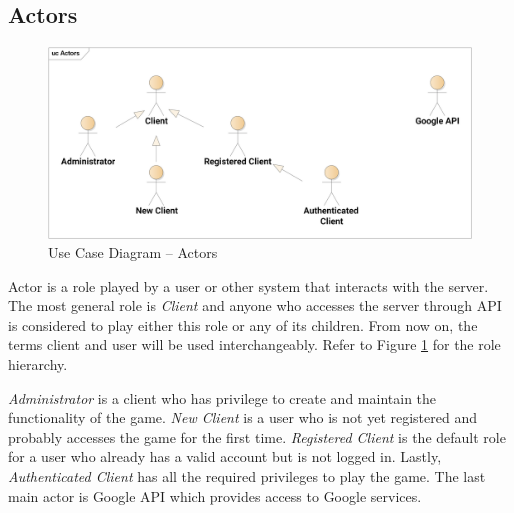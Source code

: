 	\subsection{Actors}
		\begin{figure}[h]	
			\includegraphics[width=\textwidth]{figures/UC_Actors}
			\centering			
			\caption{Use Case
				 Diagram -- Actors}
			\label{fig:ucactors}
		\end{figure}
		\noindent Actor is a role played by a user or other system that interacts with the server. The most general role is \textit{Client} and anyone who accesses the server through API is considered to play either this role or any of its children. From now on, the terms client and user will be used interchangeably. Refer to Figure \ref{fig:ucactors} for the role hierarchy.
		
		\textit{Administrator} is a client who has privilege to create and maintain the functionality of the game. \textit{New Client} is a user who is not yet registered and probably accesses the game for the first time. \textit{Registered Client} is the default role for a user who already has a valid account but is not logged in. Lastly, \textit{Authenticated Client} has all the required privileges to play the game. The last main actor is Google API which provides access to Google services. 		

